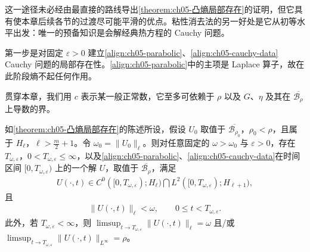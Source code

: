 \documentclass[../../main.tex]{subfiles}
\begin{document}
这一途径未必经由最直接的路线导出\cref{theorem:ch05-凸熵局部存在}的证明，但它具有使本章后续各节的过渡尽可能平滑的优点。粘性消去法的另一好处是它从初等水平出发：唯一的预备知识是会解经典热方程的 Cauchy 问题。

第一步是对固定 $\varepsilon>0$ 建立\eqref{align:ch05-parabolic}、\eqref{align:ch05-cauchy-data} Cauchy 问题的局部存在性。\eqref{align:ch05-parabolic}中的主项是 Laplace 算子，故在此阶段熵不起任何作用。

贯穿本章，我们用 $c$ 表示某一般正常数，它至多可依赖于 $\rho$ 以及 $G$、$\eta$ 及其在 $\overline{\mathscr{B}_{\rho}}$ 上导数的界。

\begin{lemma}\label{lemma:ch05-parabolic-local}
如\cref{theorem:ch05-凸熵局部存在}的陈述所设，假设 $U_{0}$ 取值于 $\overline{\mathscr{B}_{\rho_{0}}}$，$\rho_{0}<\rho$，且属于 $H_{\ell}$，$\ell>\frac{m}{2}+1$。令 $\omega_{0}=\|U_{0}\|_{\ell}$。则对任意固定的 $\omega>\omega_{0}$ 与 $\varepsilon>0$，存在 $T_{\omega,\varepsilon}$，$0<T_{\omega,\varepsilon}\leqslant\infty$，以及\eqref{align:ch05-parabolic}、\eqref{align:ch05-cauchy-data}在时间区间 $[0,T_{\omega,\varepsilon})$ 上的一个解 $U$，取值于 $\overline{\mathscr{B}_{\rho}}$，满足
\begin{align}
U(\cdot,t)\in C^{0}([0,T_{\omega,\varepsilon});H_{\ell})\bigcap L^{2}([0,T_{\omega,\varepsilon});H_{\ell+1}),\label{align:ch05-lemma-spaces}
\end{align}
且
\begin{align}
\|U(\cdot,t)\|_{\ell}<\omega,\qquad 0\leqslant t<T_{\omega,\varepsilon}.\label{align:ch05-lemma-bound}
\end{align}
此外，若 $T_{\omega,\varepsilon}<\infty$，则 $\limsup_{t\to T_{\omega,\varepsilon}}\|U(\cdot,t)\|_{\ell}=\omega$ 且/或 $\limsup_{t\to T_{\omega,\varepsilon}}\|U(\cdot,t)\|_{L^{\infty}}=\rho$。
\end{lemma}
\end{document}
